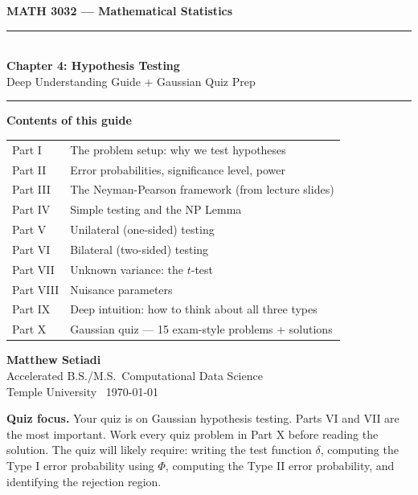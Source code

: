 \documentclass[11pt,a4paper]{article}
\begin{document}

\begin{titlepage}
\begin{center}
  \vspace*{1.5cm}
  {\LARGE\bfseries MATH 3032 --- Mathematical Statistics}\\[10pt]
  \rule{\linewidth}{1pt}\\[8pt]
  {\huge\bfseries Chapter 4: Hypothesis Testing}\\[6pt]
  {\Large Deep Understanding Guide + Gaussian Quiz Prep}\\[8pt]
  \rule{\linewidth}{1pt}
  \vspace{1cm}

  \begin{tcolorbox}[formulabox,width=0.85\textwidth,halign=center]
  \centering
  \textbf{Contents of this guide}\\[6pt]
  \begin{tabular}{ll}
    Part I   & The problem setup: why we test hypotheses \\
    Part II  & Error probabilities, significance level, power \\
    Part III & The Neyman-Pearson framework (from lecture slides) \\
    Part IV  & Simple testing and the NP Lemma \\
    Part V   & Unilateral (one-sided) testing \\
    Part VI  & Bilateral (two-sided) testing \\
    Part VII & Unknown variance: the $t$-test \\
    Part VIII & Nuisance parameters \\
    Part IX  & Deep intuition: how to think about all three types \\
    Part X   & Gaussian quiz --- 15 exam-style problems + solutions \\
  \end{tabular}
  \end{tcolorbox}

  \vspace{1cm}
  {\large\bfseries Matthew Setiadi}\\[4pt]
  {\normalsize Accelerated B.S./M.S.\ Computational Data Science}\\[2pt]
  {\normalsize Temple University \textperiodcentered\ \today}

  \vspace{1cm}
  \begin{tcolorbox}[warnbox,width=0.85\textwidth]
  \small\textbf{Quiz focus.} Your quiz is on Gaussian hypothesis testing. Parts VI and VII are the most important. Work every quiz problem in Part X before reading the solution. The quiz will likely require: writing the test function $\delta$, computing the Type I error probability using $\Phi$, computing the Type II error probability, and identifying the rejection region.
  \end{tcolorbox}


\end{center}
\end{titlepage}
\end{document}
